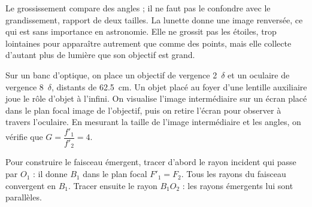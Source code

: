 \begin{attention}
Le grossissement compare des angles ; il ne faut pas le confondre avec le grandissement, rapport de deux tailles. La
lunette donne une image renversée, ce qui est sans importance en astronomie. Elle ne grossit pas les étoiles, trop
lointaines pour apparaître autrement que comme des points, mais elle collecte d'autant plus de lumière que son objectif
est grand.
\end{attention}
\begin{experience}
Sur un banc d'optique, on place un objectif de vergence \num{+2}~$\delta$ et un oculaire de vergence \num{+8}~$\delta$, distants de
\qty{62,5}{cm}. Un objet placé au foyer d'une lentille auxiliaire joue le rôle d'objet à l'infini. On visualise l'image
intermédiaire sur un écran placé dans le plan focal image de l'objectif, puis on retire l'écran pour observer à travers
l'oculaire. En mesurant la taille de l'image intermédiaire et les angles, on vérifie que $G=\dfrac{f'_1}{f'_2}=4$.
\end{experience}
\begin{rediger}
Pour construire le faisceau émergent, tracer d'abord le rayon incident qui passe par $O_1$ : il donne $B_1$ dans le plan
focal $F'_1=F_2$. Tous les rayons du faisceau convergent en $B_1$. Tracer ensuite le rayon $B_1O_2$ : les rayons émergents lui
sont parallèles.
\end{rediger}
\exercices

